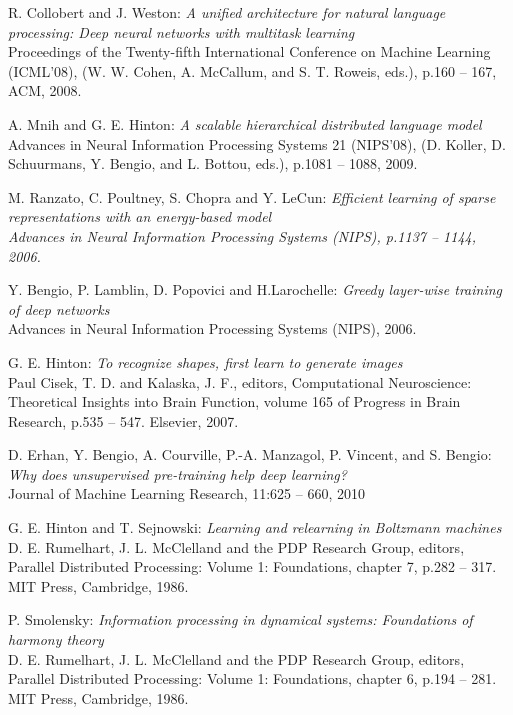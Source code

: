 \documentclass[a4paper,11pt]{report}
\begin{document}
\begin{thebibliography}{99}
	 R. Collobert and J. Weston: {\em A unified architecture for natural language processing: Deep neural networks with multitask learning}\\
	Proceedings of the Twenty-fifth International Conference on Machine Learning (ICML’08), (W. W. Cohen, A. McCallum, and S. T. Roweis, eds.), p.160 – 167, ACM, 2008.
	
	 A. Mnih and G. E. Hinton: {\em A scalable hierarchical distributed language model}\\
	Advances in Neural Information Processing Systems 21 (NIPS’08), (D. Koller, D. Schuurmans, Y. Bengio, and L. Bottou, eds.), p.1081 – 1088, 2009.
	
	 M. Ranzato, C. Poultney, S. Chopra and Y. LeCun: \em{Efficient learning of sparse representations with an energy-based model}\\
	Advances in Neural Information Processing Systems (NIPS), p.1137 – 1144, 2006.
	
	 Y. Bengio, P. Lamblin, D. Popovici and H.Larochelle: {\em Greedy layer-wise training of deep networks}\\
	Advances in Neural Information Processing Systems (NIPS), 2006.

	 G. E. Hinton: {\em To recognize shapes, first learn to generate images}\\
	Paul Cisek, T. D. and Kalaska, J. F., editors, Computational Neuroscience: Theoretical Insights into Brain Function, volume 165 of Progress in Brain Research, p.535 – 547. Elsevier, 2007.

	 D. Erhan, Y. Bengio, A. Courville, P.-A. Manzagol, P. Vincent, and S. Bengio: {\em Why does unsupervised pre-training help deep learning?}\\
	Journal of Machine Learning Research, 11:625 – 660, 2010

	 G. E. Hinton and T. Sejnowski: {\em Learning and relearning in Boltzmann machines}\\
	D. E. Rumelhart, J. L. McClelland and the PDP Research Group, editors, Parallel Distributed Processing: Volume 1: Foundations, chapter 7, p.282 – 317. MIT Press, Cambridge, 1986.
	
	 P. Smolensky: {\em Information processing in dynamical systems: Foundations of harmony theory}\\
	D. E. Rumelhart, J. L. McClelland and the PDP Research Group, editors, Parallel Distributed Processing: Volume 1: Foundations, chapter 6, p.194 – 281. MIT Press, Cambridge, 1986.
	

\end{thebibliography}
\end{document}
